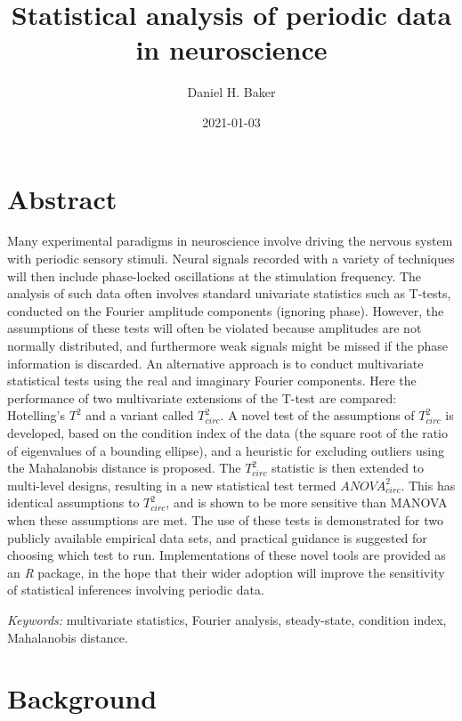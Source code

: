 \documentclass[]{article}
\title{Statistical analysis of periodic data in neuroscience}
\author{Daniel H. Baker}
\date{2021-01-03}
\begin{document}
\maketitle

\hypertarget{abstract}{%
\section{Abstract}\label{abstract}}

Many experimental paradigms in neuroscience involve driving the nervous system with periodic sensory stimuli. Neural signals recorded with a variety of techniques will then include phase-locked oscillations at the stimulation frequency. The analysis of such data often involves standard univariate statistics such as T-tests, conducted on the Fourier amplitude components (ignoring phase). However, the assumptions of these tests will often be violated because amplitudes are not normally distributed, and furthermore weak signals might be missed if the phase information is discarded. An alternative approach is to conduct multivariate statistical tests using the real and imaginary Fourier components. Here the performance of two multivariate extensions of the T-test are compared: Hotelling's \(T^2\) and a variant called \(T^2_{circ}\). A novel test of the assumptions of \(T^2_{circ}\) is developed, based on the condition index of the data (the square root of the ratio of eigenvalues of a bounding ellipse), and a heuristic for excluding outliers using the Mahalanobis distance is proposed. The \(T^2_{circ}\) statistic is then extended to multi-level designs, resulting in a new statistical test termed \(ANOVA^2_{circ}\). This has identical assumptions to \(T^2_{circ}\), and is shown to be more sensitive than MANOVA when these assumptions are met. The use of these tests is demonstrated for two publicly available empirical data sets, and practical guidance is suggested for choosing which test to run. Implementations of these novel tools are provided as an \emph{R} package, in the hope that their wider adoption will improve the sensitivity of statistical inferences involving periodic data.

\emph{Keywords:} multivariate statistics, Fourier analysis, steady-state, condition index, Mahalanobis distance.

\hypertarget{background}{%
\section{Background}\label{background}}
\end{document}
